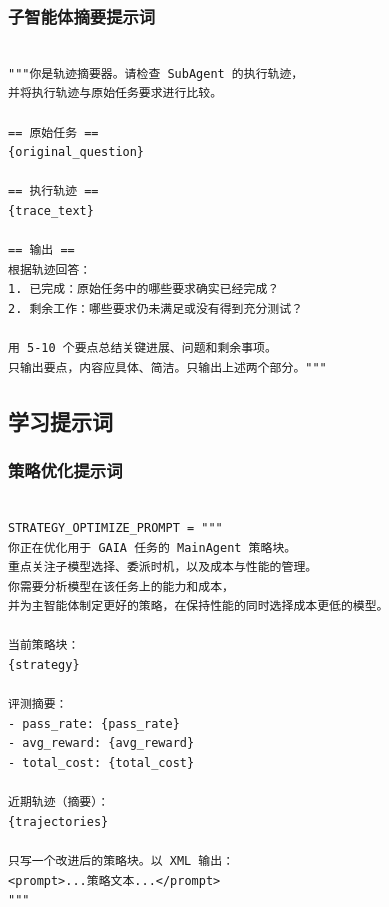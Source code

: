 \subsubsection{子智能体摘要提示词}
\label{app:B2_review}

\begin{tcolorbox}[title={\textbf{\small 子智能体摘要提示词}},   boxrule=1pt, arc=0mm,colback=black!5!white,colframe=darkgray,breakable, before skip=10pt, after skip=10pt,pad at break=2mm, parbox=false]
\begin{verbatim}

"""你是轨迹摘要器。请检查 SubAgent 的执行轨迹，
并将执行轨迹与原始任务要求进行比较。

== 原始任务 ==
{original_question}

== 执行轨迹 ==
{trace_text}

== 输出 ==
根据轨迹回答：
1. 已完成：原始任务中的哪些要求确实已经完成？
2. 剩余工作：哪些要求仍未满足或没有得到充分测试？

用 5-10 个要点总结关键进展、问题和剩余事项。
只输出要点，内容应具体、简洁。只输出上述两个部分。"""

\end{verbatim}
\end{tcolorbox}


\subsection{学习提示词}

\subsubsection{策略优化提示词}
\begin{tcolorbox}[title={\textbf{\small 策略优化提示词}},   boxrule=1pt, arc=0mm,colback=black!5!white,colframe=darkgray,breakable, before skip=10pt, after skip=10pt,pad at break=2mm, parbox=false]
\begin{verbatim}

STRATEGY_OPTIMIZE_PROMPT = """
你正在优化用于 GAIA 任务的 MainAgent 策略块。
重点关注子模型选择、委派时机，以及成本与性能的管理。
你需要分析模型在该任务上的能力和成本，
并为主智能体制定更好的策略，在保持性能的同时选择成本更低的模型。

当前策略块：
{strategy}

评测摘要：
- pass_rate: {pass_rate}
- avg_reward: {avg_reward}
- total_cost: {total_cost}

近期轨迹（摘要）：
{trajectories}

只写一个改进后的策略块。以 XML 输出：
<prompt>...策略文本...</prompt>
"""

\end{verbatim}
\end{tcolorbox}

